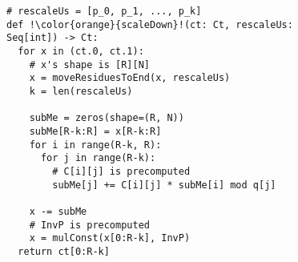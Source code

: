\begin{figure}
\begin{lstlisting}[escapechar=!,label=lst:scaleDown,caption={
  Implementation of \texttt{scaleDown}.
}]
# rescaleUs = [p_0, p_1, ..., p_k]
def !\color{orange}{scaleDown}!(ct: Ct, rescaleUs: Seq[int]) -> Ct:
  for x in (ct.0, ct.1):
    # x's shape is [R][N]
    x = moveResiduesToEnd(x, rescaleUs)
    k = len(rescaleUs)

    subMe = zeros(shape=(R, N))
    subMe[R-k:R] = x[R-k:R]
    for i in range(R-k, R):
      for j in range(R-k):
        # C[i][j] is precomputed
        subMe[j] += C[i][j] * subMe[i] mod q[j]

    x -= subMe
    # InvP is precomputed
    x = mulConst(x[0:R-k], InvP)
  return ct[0:R-k]
\end{lstlisting}
\vspace{-0.15in}
\end{figure}
